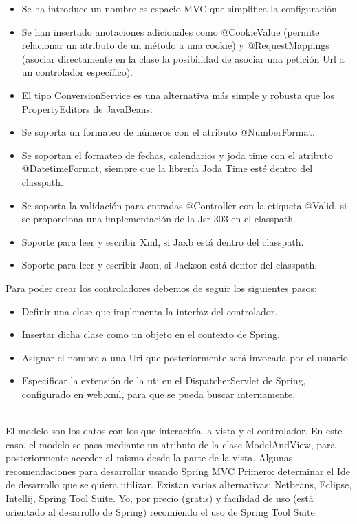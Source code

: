 \begin{itemize}
		\begin{itemize}
			\item Se ha introduce un nombre es espacio MVC que simplifica la configuración.
			\item Se han insertado anotaciones adicionales como @CookieValue (permite relacionar un atributo de un método a una cookie) y @RequestMappings (asociar directamente en la clase la posibilidad de asociar una petición Url a un controlador específico).
			\item El tipo ConversionService es una alternativa más simple y robusta que los PropertyEditors de JavaBeans.
			\item Se soporta un formateo de números con el atributo @NumberFormat.
			\item Se soportan el formateo de fechas, calendarios y joda time con el atributo @DatetimeFormat, siempre que la librería Joda Time esté dentro del classpath.
			\item Se soporta la validación para entradas @Controller con la etiqueta @Valid, si se proporciona una implementación de la Jsr-303 en el classpath.
			\item Soporte para leer y escribir Xml, si Jaxb está dentro del classpath.
			\item Soporte para leer y escribir Json, si Jackson está dentor del classpath.
		\end{itemize}
		Para poder crear los controladores debemos de seguir los siguientes pasos:
		\begin{itemize}
			\item Definir una clase que implementa la interfaz del controlador.
			\item Insertar dicha clase como un objeto en el contexto de Spring.
			\item Asignar el nombre a una Uri que posteriormente será invocada por el usuario.
			\item Especificar la extensión de la uti en el DispatcherServlet de Spring, configurado en web.xml, para que se pueda buscar internamente.
		\end{itemize}
		\\
		El modelo son los datos con los que interactúa la vista y el controlador. En este caso, el modelo se pasa mediante un atributo de la clase ModelAndView, para posteriormente acceder al mismo desde la parte de la vista. \cite{introspring}
		Algunas recomendaciones para desarrollar usando Spring MVC
		Primero: determinar el Ide de desarrollo que se quiera utilizar. Existan varias alternativas: Netbeans, Eclipse, Intellij, Spring Tool Suite. Yo, por precio (gratis) y facilidad de uso (está orientado al desarrollo de Spring) recomiendo el uso de Spring Tool Suite. \\
		

\end{itemize}
